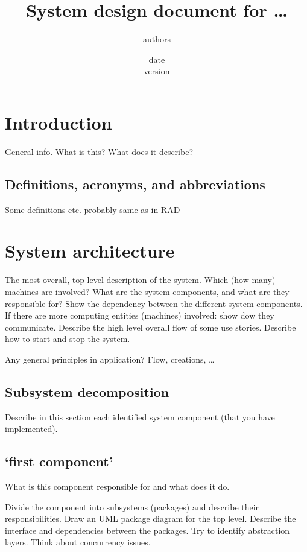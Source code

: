 \documentclass[12pt,a4paper]{scrartcl}
\title{System design document for \ldots}
\author{authors}
\date{date\\version}
\begin{document}
\maketitle

\section{Introduction}

General info. What is this? What does it describe?

\subsection{Definitions, acronyms, and abbreviations}

Some definitions etc. probably same as in RAD


\section{System architecture}

The most overall, top level description of the system. Which (how many)
machines are involved? What are the system components, and what are they 
responsible for? Show the dependency between the different system components.
If there are more computing entities (machines) involved: show dow they 
communicate. Describe the high level overall flow of some use stories. Describe
how to start and stop the system.

Any general principles in application? Flow, creations, \ldots


\subsection{Subsystem decomposition}

Describe in this section each identified system component (that you have implemented).

\subsection{`first component'}

What is this component responsible for and what does it do.

Divide the component into subsystems (packages) and describe their
responsibilities. Draw an UML package diagram for the top level. Describe the
interface and dependencies between the packages. Try to identify abstraction
layers. Think about concurrency issues.
\end{document}
